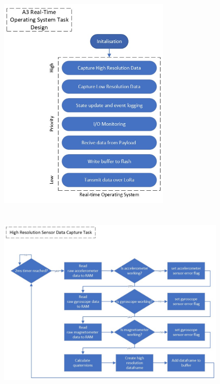 \clearpage
\chapter{}\label{apdx:C}
\vfill{}
\begin{figure}[h!]
  \hspace{2.5em}\includegraphics[width=0.75\textwidth]{./img/Section_4_2_2.jpeg}
\end{figure}
\vfill{}

\clearpage
\chapter{}\label{apdx:D}
\vfill{}
\begin{figure}[h!]
  \begin{center}
    \includegraphics[width=\textwidth]{./img/Section_4_2_2_1.jpeg}
  \end{center}
\end{figure}
\vfill{}

